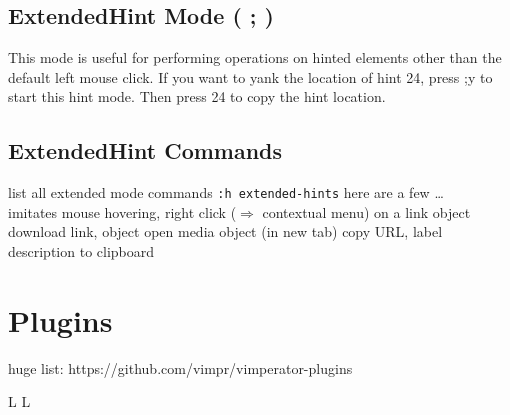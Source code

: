 \subsection{ExtendedHint Mode ( ; )}{This mode is useful for
performing operations on hinted elements other than the default
left mouse click. If you want to yank the location of hint 24, press ;y to start this hint
mode. Then press 24 to copy the hint location.}
\subsection{ExtendedHint Commands}{list all extended mode commands {\tt :h extended-hints}}
here are a few \ldots\\
	{imitates mouse hovering, right click ($\Rightarrow$ contextual menu) on a link object}
	{download link, object}
	{open media object (in new tab)}
	{copy URL, label description to clipboard}

\section{Plugins}{huge list: https://github.com/vimpr/vimperator-plugins}
\copyrightnotice
%


\vfil
\supereject
\if L\lr \else\null\vfill\eject\fi
\if L\lr \else\null\vfill\eject\fi
\bye

